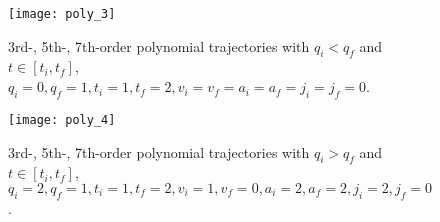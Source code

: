 \begin{figure}[H]
\centering
\texttt{[image: poly\_3]}
\caption{3rd-, 5th-, 7th-order polynomial trajectories with $q_i<q_f$ and $t\in[t_i,t_f]$, $q_i=0,q_f=1,t_i=1,t_f=2, v_i=v_f=a_i=a_f=j_i=j_f=0$.}
\label{fig:poly_3}
\end{figure}

\begin{figure}[H]
\centering
\texttt{[image: poly\_4]}
\caption{3rd-, 5th-, 7th-order polynomial trajectories with $q_i>q_f$ and $t\in[t_i,t_f]$, $q_i=2,q_f=1,t_i=1,t_f=2, v_i=1,v_f=0,a_i=2,a_f=2,j_i=2,j_f=0$.}
\label{fig:poly_4}
\end{figure}